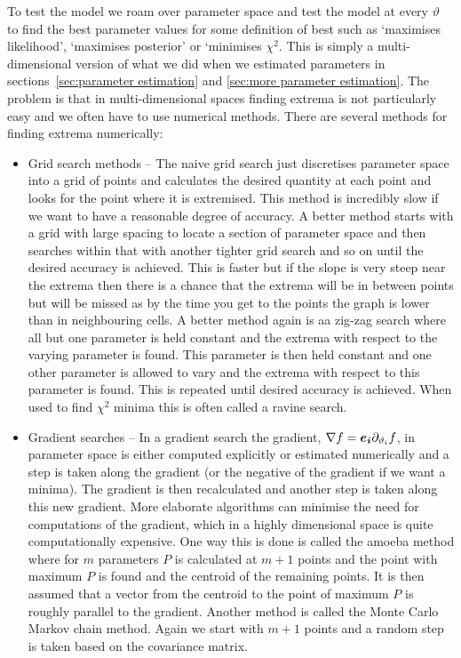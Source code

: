 \documentclass[a4paper]{article}
\begin{document}
    To test the model we roam over parameter space and test the model at every \(\vartheta\) to find the best parameter values for some definition of best such as `maximises likelihood', `maximises posterior' or `minimises \(\chi^2\).
    This is simply a multi-dimensional version of what we did when we estimated parameters in sections~\ref{sec:parameter estimation} and \ref{sec:more parameter estimation}.
    The problem is that in multi-dimensional spaces finding extrema is not particularly easy and we often have to use numerical methods.
    There are several methods for finding extrema numerically:
    \begin{itemize}
        \item Grid search methods -- The naive grid search just discretises parameter space into a grid of points and calculates the desired quantity at each point and looks for the point where it is extremised.
        This method is incredibly slow if we want to have a reasonable degree of accuracy.
        A better method starts with a grid with large spacing to locate a section of parameter space and then searches within that with another tighter grid search and so on until the desired accuracy is achieved.
        This is faster but if the slope is very steep near the extrema then there is a chance that the extrema will be in between points but will be missed as by the time you get to the points the graph is lower than in neighbouring cells.
        A better method again is  aa zig-zag search where all but one parameter is held constant and the extrema with respect to the varying parameter is found.
        This parameter is then held constant and one other parameter is allowed to vary and the extrema with respect to this parameter is found.
        This is repeated until desired accuracy is achieved.
        When used to find \(\chi^2\) minima this is often called a ravine search.
        
        \item Gradient searches -- In a gradient search the gradient, \(\nabla f = \bm{e_{i}}\partial_{\vartheta_i}f\), in parameter space is either computed explicitly or estimated numerically and a step is taken along the gradient (or the negative of the gradient if we want a minima).
        The gradient is then recalculated and another step is taken along this new gradient.
        More elaborate algorithms can minimise the need for computations of the gradient, which in a highly dimensional space is quite computationally expensive.
        One way this is done is called the amoeba method where for \(m\) parameters \(P\) is calculated at \(m + 1\) points and the point with maximum \(P\) is found and the centroid of the remaining points.
        It is then assumed that a vector from the centroid to the point of maximum \(P\) is roughly parallel to the gradient.
        Another method is called the Monte Carlo Markov chain method.
        Again we start with \(m + 1\) points and a random step is taken based on the covariance matrix.
        

\end{itemize}
\end{document}
